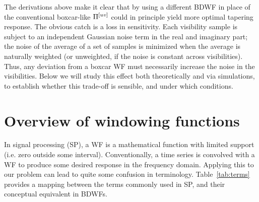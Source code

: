 \documentclass[useAMS,usenatbib]{mn2e}
\begin{document}
The derivations above make it clear that by using a different BDWF in place of the conventional boxcar-like $\Pi^{[uv]}$ 
could in principle yield more optimal tapering response. The obvious catch is a loss in 
sensitivity. Each visibility sample is subject to an independent Gaussian noise term in the real and imaginary part; the noise of
the average of a set of samples is minimized when the average is naturally weighted (or unweighted, if the noise is 
constant across visibilities). Thus, any deviation from a boxcar WF must necessarily increase the noise in the 
visibilities. Below we will study this effect both theoretically and via simulations, to establish whether this 
trade-off is sensible, and under which conditions.

\section{Overview of windowing functions}
\label{subsec:Windowing functions}

In signal processing (SP), a WF is a mathematical function with limited support (i.e. zero outside some interval). Conventionally,
a time series is convolved with a WF to produce some desired response in the frequency domain. Applying this to our problem
can lead to quite some confusion in terminology. Table~\ref{tab:terms} provides a mapping between the terms commonly used in SP, 
and their conceptual equivalent in BDWFs.
\end{document}
